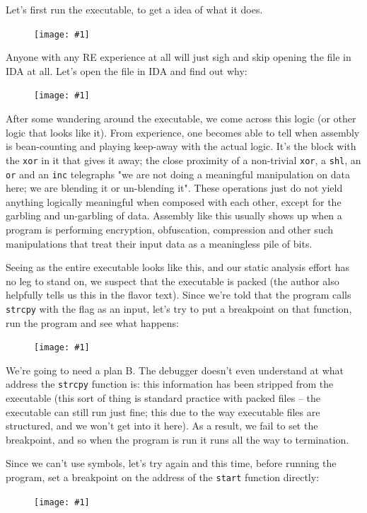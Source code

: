 \documentclass{article}
\newcommand{\displayimage}[1] {
\begin{figure}[H]
    \centering
    \texttt{[image: \#1]} 
\end{figure}
}
\newcommand{\xcode}[2]{\colorbox{ubuntuback}{\lstinline[language=#1]|#2|}}
\newcommand{\asm}[1]{\xcode{{[x86masm]assembler}}{#1}}
\begin{document}
Let's first run the executable, to get a idea of what it does.

\displayimage{./exercises/03_flag/program_output.png}

Anyone with any RE experience at all will just sigh and skip opening the file in IDA at all. Let's open the file in IDA and find out why: 

\displayimage{./exercises/03_flag/packed_assembly.png}

After some wandering around the executable, we come across this logic (or other logic that looks like it). From experience, one becomes able to tell when assembly is bean-counting and playing keep-away with the actual logic. It's the block with the \asm{xor} in it that gives it away; the close proximity of a non-trivial \asm{xor}, a \asm{shl}, an \asm{or} and an \asm{inc} telegraphs "we are not doing a meaningful manipulation on data here; we are blending it or un-blending it". These operations just do not yield anything logically meaningful when composed with each other, except for the garbling and un-garbling of data. Assembly like this usually shows up when a program is performing encryption, obfuscation, compression and other such manipulations that treat their input data as a meaningless pile of bits.

Seeing as the entire executable looks like this, and our static analysis effort has no leg to stand on, we suspect that the executable is packed (the author also helpfully tells us this in the flavor text). Since we're told that the program calls \xcode{C}{strcpy} with the flag as an input, let's try to put a breakpoint on that function, run the program and see what happens:

\displayimage{./exercises/03_flag/first_attempt.png}

We're going to need a plan B. The debugger doesn't even understand at what address the \xcode{C}{strcpy} function is: this information has been stripped from the executable (this sort of thing is standard practice with packed files -- the executable can still run just fine; this due to the way executable files are structured, and we won't get into it here). As a result, we fail to set the breakpoint, and so when the program is run it runs all the way to termination.

Since we can't use symbols, let's try again and this time, before running the program, set a breakpoint on the address of the \xcode{C}{start} function directly:

\displayimage{./exercises/03_flag/start_breakpoint.png}
\end{document}
